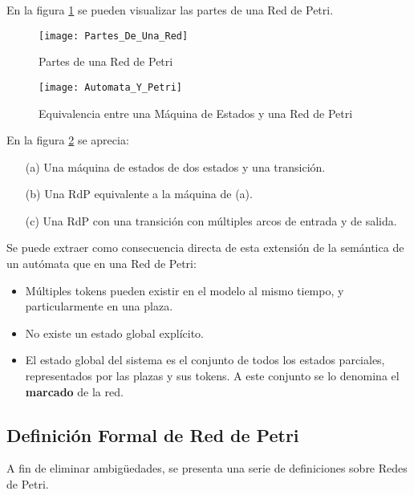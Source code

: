 En la figura \ref{fig:partes_de_una_red} se pueden visualizar las partes de una
Red de Petri.

\begin{figure}[H]
	\centering
	\texttt{[image: Partes\_De\_Una\_Red]}
	\caption{Partes de una Red de Petri}
	\label{fig:partes_de_una_red}
\end{figure}

\begin{figure}[H]
    \centering
    \texttt{[image: Automata\_Y\_Petri]}
    \caption{Equivalencia entre una Máquina de Estados y una Red de Petri}
    \label{fig:automata_y_petri}
\end{figure}

En la figura \ref{fig:automata_y_petri} se aprecia:\\
\begin{itemize}
  \item[(a)] Una máquina de estados de dos estados y una transición.
  \item[(b)] Una RdP equivalente a la máquina de (a).
  \item[(c)] Una RdP con una transición con múltiples arcos de entrada y de
  salida.
\end{itemize}

Se puede extraer como consecuencia directa de esta extensión de la semántica de
un autómata que en una Red de Petri:
\begin{itemize}
  \item Múltiples tokens pueden existir en el modelo al mismo tiempo, y
  particularmente en una plaza.
  \item No existe un estado global explícito.
  \item El estado global del sistema es el conjunto de todos los estados
  parciales, representados por las plazas y sus tokens. A este conjunto se lo
  denomina el \textbf{marcado} de la red.
\end{itemize}

\subsection{Definición Formal de Red de Petri}
\label{def_formal_petri}
A fin de eliminar ambigüedades, se presenta una serie de definiciones sobre
Redes de Petri.

